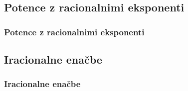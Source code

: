     \subsection{Potence z racionalnimi eksponenti}

        \begin{frame}
            \frametitle{Potence z racionalnimi eksponenti}
        \end{frame}


    \subsection{Iracionalne enačbe}

        \begin{frame}
            \frametitle{Iracionalne enačbe}
        \end{frame}
